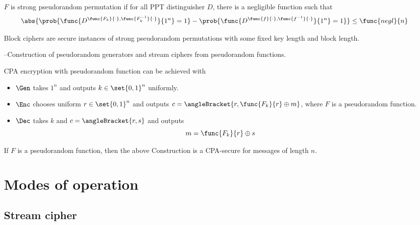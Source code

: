 \begin{definition}
    \(F\) is strong pseudorandom permutation if for all PPT distinguisher \(D\), there is a negligible function such that 
    \begin{equation*}
        \abs{\prob{\func{D^{\func{F_k}{\cdot}, \func{F_k^{-1}}{\cdot}}}{1^n} = 1} - \prob{\func{D^{\func{f}{\cdot}, \func{f^{-1}}{\cdot}}}{1^n} = 1}} \leq \func{negl}{n}
    \end{equation*}
\end{definition}

\begin{definition}
    Block ciphers are secure instances of strong pseudorandom permutations with some fixed key length and block length.
\end{definition}

--Construction of pseudorandom generators and stream ciphers from pseudorandom functions.

\begin{definition}
    CPA encryption with pseudorandom function can be achieved with 
    \begin{itemize}
        \item \(\Gen\) takes \(1^n\) and outputs \(k \in \set{0,1}^n\) uniformly.
        \item \(\Enc\) chooses uniform \(r \in \set{0,1}^n\) and outputs \(c = \angleBracket{r,\func{F_k}{r} \oplus m}\), where \(F\) is a pseudorandom function.
        \item \(\Dec\) takes \(k\) and \(c = \angleBracket{r,s}\) and outputs 
        \begin{equation*}
            m = \func{F_k}{r} \oplus s
        \end{equation*}
    \end{itemize}
\end{definition}

\begin{theorem}
    If \(F\) is a pseudorandom function, then the above Construction is a CPA-secure for messages of length \(n\).
\end{theorem}

\section{Modes of operation}
\subsection{Stream cipher}
